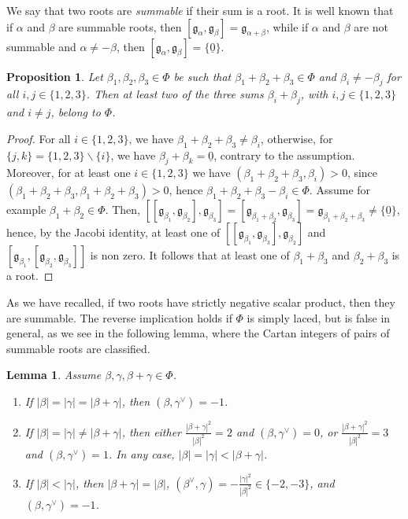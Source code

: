 \documentclass[10pt]{amsart}
\newtheorem{pro}[thm]{Proposition}
\newtheorem{lem}[thm]{Lemma}
\theoremstyle{definition}
\theoremstyle{remark}
\newcommand\mf{\mathfrak}
\newcommand\smeno{\smallsetminus}
\newcommand\nullvec{\underline 0}
\newcommand\al{\alpha}
\newcommand\be{\beta}
\newcommand\ga{\gamma}
\begin{document}
\par
We say that two roots are {\it summable} if their sum is a root.
It is well known that if $\al$ and $\be$ are summable roots, then $[\mf g_\al,\mf g_\be]=\mf g_{\al+\be}$, while if  $\al$ and $\be$ are not summable and $\al\neq -\be$, then  $[\mf g_\al,\mf g_\be]=\{\nullvec\}$. 

\begin{pro}\label{pro:smart}
Let $\be_1, \be_2, \be_3\in  \Phi$ be such that $\be_1+\be_2+\be_3\in \Phi$  and $\be_i\neq -\be_j$ for all $i, j\in\{1, 2, 3\}$.
Then at least two of the three sums $\be_i+\be_j$, with $i, j\in\{1, 2, 3\}$ and $i\neq j$, belong to $\Phi$.
\end{pro}

\begin{proof}
For all $i\in \{1, 2, 3\}$, we have $\be_1+\be_2+\be_3\neq \be_i$, otherwise, for $\{j, k\}=\{1, 2, 3\}\smeno\{i\}$, we have $\be_j+\be_k=\nullvec$, contrary to the assumption.
Moreover, for at least one $i\in \{1, 2, 3\}$ we have $(\be_1+\be_2+\be_3, \be_i)>0$, since $(\be_1+\be_2+\be_3, \be_1+\be_2+\be_3)>0$,  hence  $\be_1+\be_2+\be_3- \be_i\in \Phi$. 
Assume for example $\be_1+\be_2\in \Phi$. 
Then, $[[\mf g_{\be_1}, \mf g_{\be_2}],\mf g_{\be_3}]=[\mf g_{\be_1+\be_2},\mf g_{\be_3}]=\mf g_{\be_1+\be_2+\be_3}\neq \{\nullvec\}$, hence, by the Jacobi identity, at least one of $[[\mf g_{\be_1}, \mf g_{\be_3}],\mf g_{\be_2}]$ 
and $[\mf g_{\be_1}, [\mf g_{\be_2},\mf g_{\be_3}]]$ is non zero. It follows that at least one of $\be_1+\be_3$ and $\be_2+\be_3$ is a root.
\end{proof}

\par
As we have recalled, if two roots have strictly negative scalar product, then they are summable. 
The reverse implication holds if $\Phi$ is simply laced, but is false in general, as we see in the following lemma, where the Cartan integers of pairs of summable roots are classified. 

\pagebreak

\begin{lem}\label{lem:esercizio}
Assume $\be, \ga, \be+\ga\in \Phi$. 
\begin{enumerate}
\item
If $|\be|=|\ga|=|\be+\ga|$, then $(\be, \ga^\vee)=-1$.
\label{itm:all-equal-lengths}
\item
If $|\be|=|\ga|\neq |\be+\ga|$, then either 
$\frac{|\be+\ga|^2}{ |\be|^2}= 2$ and  $(\be, \ga^\vee)=0$, or $\frac{|\be+\ga|^2}{ |\be|^2}=3$ and  $(\be, \ga^\vee)=1$. 
In any case, $|\be|=| \ga|< |\be+\ga|$.
\label{itm:equal-lengths-summands}
\item
If $|\be|<|\ga|$, then $|\be+\ga|=|\be|$, $(\be^\vee,\ga)=-\frac{|\ga|^2}{ |\be|^2}\in \{-2, -3\}$, and  $(\be, \ga^\vee)=-1$.  
\label{itm:two-lengths-summands}
\end{enumerate}
\end{lem}
\end{document}
